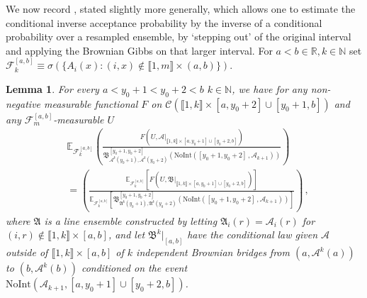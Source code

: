\documentclass[11pt, reqno]{amsart}
\numberwithin{equation}{section}
\newcounter{dummy} \numberwithin{dummy}{section}
\newtheorem{lemma}[dummy]{Lemma}
\newcommand{\N}{\ensuremath{\mathbb{N}}}
\newcommand{\R}{\ensuremath{\mathbb{R}}}
\begin{document}
We now record \cite[Lemma 3.1]{dauvergne2024wienerdensitiesairyline}, stated slightly more generally, which allows one to estimate the conditional inverse acceptance probability by the inverse of a conditional probability over a resampled ensemble, by `stepping out' of the original interval and applying the Brownian Gibbs on that larger interval. For $a<b\in \R, k\in \N$ set $\mathcal{F}^{[a,b]}_k\equiv \sigma(\{A_i(x): (i,x)\notin \llbracket 1,m\rrbracket \times (a,b)\})$.

\begin{lemma}{\cite[Lemma 3.1]{dauvergne2024wienerdensitiesairyline}}\label{lemma: inv acceptance prob cond dauv}
	For every $a<y_0+1<y_0+2<b$ $k\in \N$, we have for any non-negative measurable functional $F$ on $\mathscr{C}(\llbracket 1, k\rrbracket \times [a,y_0+2]\cup [y_0+1,b])$ and any $\mathscr{F}^{[a,b]}_m$-measurable $U$
	\begin{equation}
    \begin{array}{ll}
	\label{E:big-eqn}
		&\displaystyle\mathbb{E}_{\mathscr{F}^{[a,b]}_k} \left(\frac{F(U, \mathcal{A}|_{\llbracket 1, k\rrbracket \times [a,y_0+1]\cup [y_0+2,b]})}{\mathfrak{B}^{[y_0+1,y_0+2]}_{\mathcal{A}^k(y_0+1),\mathcal{A}^k(y_0+2)}(\mathrm{NoInt}([y_0+1, y_0+2]\,, \mathcal{A}_{k+1}))} \right)\\
        & = \displaystyle\left(\frac{\mathbb{E}_{\mathscr{F}^{[a,b]}_k} [ F(U, \mathfrak{B}|_{\llbracket 1, k\rrbracket \times [a,y_0+1]\cup [y_0+2,b]}) ]}{\mathbb{E}_{\mathscr{F}^{[a,b]}_k} [\mathfrak{B}^{[y_0+1,y_0+2]}_{\mathfrak{A}^k(y_0+1),\mathfrak{A}^k(y_0+2)}(\mathrm{NoInt}([y_0+1, y_0+2]\,, \mathcal{A}_{k+1}))]} \right)\,,
        \end{array}
	\end{equation}
        where $\mathfrak{A}$ is a line ensemble constructed by letting $\mathfrak{A}_{i}(r) = \mathcal{A}_i(r)$ for $(i, r) \notin \llbracket 1, k\rrbracket \times [a, b]$, and let $\mathfrak{B}^k|_{[a, b]}$ have the conditional law given $\mathcal{A}$ outside of $\llbracket 1, k\rrbracket \times [a, b]$ of $k$ independent Brownian bridges from $(a, \mathcal{A}^k(a))$ to $(b, \mathcal{A}^k(b))$ conditioned on the event $\mathrm{NoInt}(\mathcal{A}_{k+1}, [a, y_0+1] \cup [y_0+2, b])$.
\end{lemma}
\end{document}
